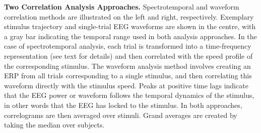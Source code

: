 \textbf{Two Correlation Analysis Approaches.} Spectrotemporal and waveform
correlation methods are illustrated on the left and right, respectively.
Exemplary stimulus trajectory and single-trial EEG waveforms are shown in
the centre, with a gray bar indicating the temporal range used in both
analysis approaches. In the case of spectrotemporal analysis, each trial is
transformed into a time-frequency representation (see text for details) and
then correlated with the speed profile of the corresponding stimulus. The
waveform analysis method involves creating an ERP from all trials
corresponding to a single stimulus, and then correlating this waveform
directly with the stimulus speed. Peaks at positive time lags indicate that
the EEG power or waveform follows the temporal dynamics of the stimulus, in
other words that the EEG has locked to the stimulus. In both approaches,
correlograms are then averaged over stimuli. Grand averages are created by
taking the median over subjects.
